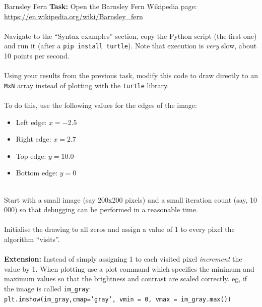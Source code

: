 \documentclass{lab}
\begin{document}
\begin{task}{Barnsley Fern}{}
\textbf{Task:} Open the Barnsley Fern Wikipedia page: \url{https://en.wikipedia.org/wiki/Barnsley_fern}
\\~\\
Navigate to the ``Syntax examples'' section, copy the Python script (the first one) and run it (after a \texttt{pip install turtle}). Note that execution is \textit{very} slow, about 10 points per second.
\\~\\
Using your results from the previous task, modify this code to draw directly to an \texttt{MxN} array instead of plotting with the \texttt{turtle} library.
\\~\\
To do this, use the following values for the edges of the image:
\\
\begin{itemize}
\item Left edge: $x=-2.5$
\item Right edge: $x=2.7$
\item Top edge: $y=10.0$
\item Bottom edge: $y=0$
\end{itemize}
~\\
Start with a small image (say 200x200 pixels) and a small iteration count (say, 10 000) so that debugging can be performed in a reasonable time.
\\~\\
Initialise the drawing to all zeros and assign a value of 1 to every pixel the algorithm ``visits''.
\\~\\
\textbf{Extension:} Instead of simply assigning 1 to each visited pixel \textit{increment} the value by 1. When plotting use a plot command which specifies the minimum and maximum values so that the brightness and contrast are scaled correctly. eg, if the image is called \texttt{im\_gray}:\\ \texttt{plt.imshow(im\_gray,cmap='gray', vmin = 0, vmax = im\_gray.max())}
\end{task}
\end{document}
